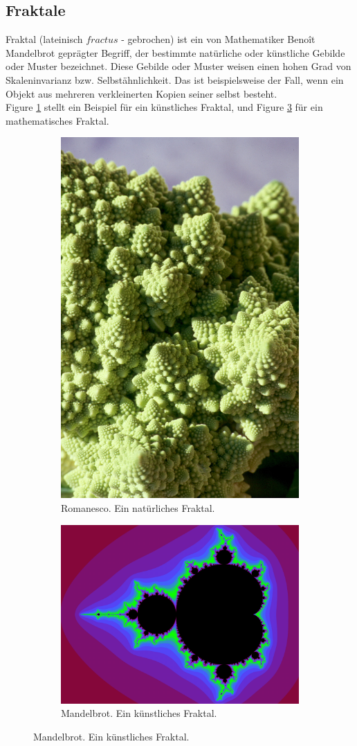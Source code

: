 \documentclass[a4paper,12pt]{llncs}
\numberwithin{equation}{section}
\begin{document}
\subsection{Fraktale}
Fraktal (lateinisch $fractus$ - gebrochen) ist ein von Mathematiker Benoît Mandelbrot geprägter Begriff, der bestimmte natürliche oder künstliche Gebilde oder Muster bezeichnet. Diese Gebilde oder Muster weisen einen hohen Grad von Skaleninvarianz bzw. Selbstähnlichkeit. 
Das ist beispielsweise der Fall, wenn ein Objekt aus mehreren verkleinerten Kopien seiner selbst besteht. \cite{fraktal} \\
Figure \ref{fig:frac_kunst} stellt ein Beispiel für ein künstliches Fraktal, und Figure \ref{fig:frac_math} für ein mathematisches Fraktal.
\begin{figure}[ht]   
	\begin{subfigure}{.5\textwidth}
	\centering
	\includegraphics[width=.4\linewidth]{figures/Romanesco}
	\caption{Romanesco. Ein natürliches Fraktal. \cite{fractal_romanesco}}
	\label{fig:frac_kunst}
\end{subfigure}%
\begin{subfigure}{.5\textwidth}
	\centering
	\includegraphics[width=.4\linewidth]{figures/Mandelbrot}
	\caption{Mandelbrot. Ein künstliches Fraktal. \cite{fractal_mandelbrot}}
	\label{fig:frac_math}
\end{subfigure}%
\end{figure}
\end{document}
